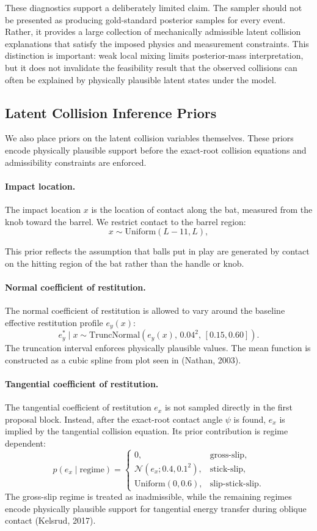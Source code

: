 \documentclass[11pt]{article}
\begin{document}
These diagnostics support a deliberately limited claim. The sampler should not be presented as producing gold-standard posterior samples for every event. Rather, it provides a large collection of mechanically admissible latent collision explanations that satisfy the imposed physics and measurement constraints. This distinction is important: weak local mixing limits posterior-mass interpretation, but it does not invalidate the feasibility result that the observed collisions can often be explained by physically plausible latent states under the model.


\subsection{Latent Collision Inference Priors}

We also place priors on the latent collision variables themselves. These priors encode physically plausible support before the exact-root collision equations and admissibility constraints are enforced.

\paragraph{Impact location.}
The impact location $x$ is the location of contact along the bat, measured from the knob toward the barrel. We restrict contact to the barrel region:
\[
x \sim \mathrm{Uniform}(L-11,L),
\]

This prior reflects the assumption that balls put in play are generated by contact on the hitting region of the bat rather than the handle or knob.

\paragraph{Normal coefficient of restitution.}
The normal coefficient of restitution is allowed to vary around the baseline effective restitution profile $e_y(x)$:
\[
e_y^{\ast}\mid x
\sim
\mathrm{TruncNormal}
\left(
e_y(x),\,
0.04^2,\,
[0.15,0.60]
\right).
\]
The truncation interval enforces physically plausible values. The mean function is constructed as a cubic spline from plot seen in (Nathan, 2003).

\paragraph{Tangential coefficient of restitution.}
The tangential coefficient of restitution $e_x$ is not sampled directly in the first proposal block. Instead, after the exact-root contact angle $\psi$ is found, $e_x$ is implied by the tangential collision equation. Its prior contribution is regime dependent:
\[
p(e_x\mid \mathrm{regime})
=
\begin{cases}
0,
&
\mathrm{gross\text{-}slip}, \\[4pt]
\mathcal{N}(e_x;0.4,0.1^2),
&
\mathrm{stick\text{-}slip}, \\[4pt]
\mathrm{Uniform}(0,0.6),
&
\mathrm{slip\text{-}stick\text{-}slip}.
\end{cases}
\]
The gross-slip regime is treated as inadmissible, while the remaining regimes encode physically plausible support for tangential energy transfer during oblique contact (Kelsrud, 2017).
\end{document}
